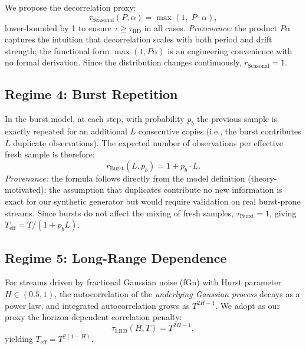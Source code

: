 \documentclass[preprint,12pt,authoryear]{elsarticle}
\newcommand{\Teff}{T_{\mathrm{eff}}}
\begin{document}
We propose the decorrelation proxy:
\begin{equation}
    \tau_{\text{Seasonal}}(P, \alpha) = \max(1,\; P \cdot \alpha),
    \label{eq:tau_seasonal}
\end{equation}
lower-bounded by 1 to ensure $\tau \geq \tau_{\text{IID}}$ in all cases. \emph{Provenance:} the product $P\alpha$ captures the intuition that decorrelation scales with both period and drift strength; the functional form $\max(1, P\alpha)$ is an engineering convenience with no formal derivation. Since the distribution changes continuously, $r_{\text{Seasonal}} = 1$.

\subsection{Regime 4: Burst Repetition}

In the burst model, at each step, with probability $p_b$ the previous sample is exactly repeated for an additional $L$ consecutive copies (i.e., the burst contributes $L$ duplicate observations). The expected number of observations per effective fresh sample is therefore:
\begin{equation}
    r_{\text{Burst}}(L, p_b) = 1 + p_b \cdot L.
    \label{eq:r_burst}
\end{equation}
\emph{Provenance:} the formula follows directly from the model definition (theory\nobreakdash-motivated); the assumption that duplicates contribute no new information is exact for our synthetic generator but would require validation on real burst-prone streams. Since bursts do not affect the mixing of fresh samples, $\tau_{\text{Burst}} = 1$, giving $\Teff = T/(1 + p_b L)$.

\subsection{Regime 5: Long-Range Dependence}

For streams driven by fractional Gaussian noise (fGn) with Hurst parameter $H \in (0.5, 1)$, the autocorrelation of the \emph{underlying Gaussian process} decays as a power law, and integrated autocorrelation grows as $T^{2H-1}$. We adopt as our proxy the horizon-dependent correlation penalty:
\begin{equation}
    \tau_{\text{LRD}}(H, T) = T^{2H-1},
    \label{eq:tau_lrd}
\end{equation}
yielding $\Teff = T^{2(1-H)}$.
\end{document}
